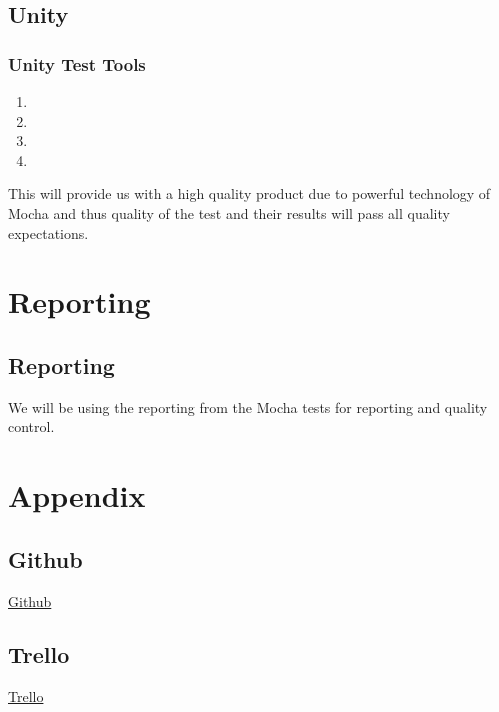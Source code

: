 \documentclass{article}
\begin{document}
	\subsection{Unity}
		\subsubsection{Unity Test Tools}
			\begin{enumerate}
				\item 
				\item 
				\item 
				\item 
			\end{enumerate}
			\noindent
			This will provide us with a high quality product due to powerful technology of Mocha and thus quality of the test and their results will pass all quality expectations.
\section{Reporting}
   	\subsection{Reporting}
		We will be using the reporting from the Mocha tests for reporting and quality control.
  
\section{Appendix}
	\subsection{Github}
		\href{https://github.com/KobusMarais/Cerebero}{Github}
	\subsection{Trello}
		\href{https://trello.com/b/WXh8cJZQ/demo-2}{Trello}
\end{document}
